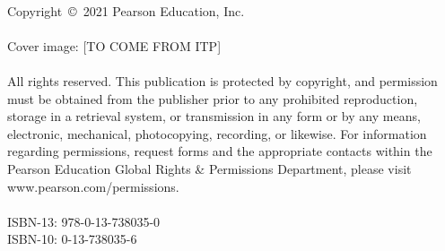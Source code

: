 {\hspace{\fill}\\
\noindent Copyright~\copyright~2021 Pearson Education, Inc.\\
\hspace{\fill}\\
\noindent Cover image: [TO COME FROM ITP]\\
\hspace*{\fill}\\
\noindent All rights reserved. This publication is protected by copyright, and permission must be obtained from the publisher prior to any prohibited reproduction, storage in a retrieval system, or transmission in any form or by any means, electronic, mechanical, photocopying, recording, or likewise. For information regarding permissions, request forms and the appropriate contacts within the Pearson Education Global Rights \& Permissions Department, please visit www.pearson.com/permissions.\\
\hspace*{\fill}\\
\noindent ISBN-13: 978-0-13-738035-0\\[-.5ex] %
\noindent ISBN-10: 0-13-738035-6 \\ %
\hspace*{\fill}\\
}